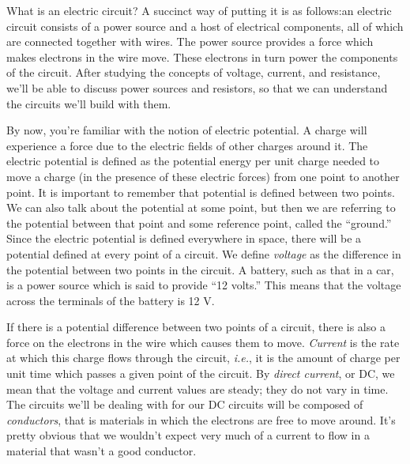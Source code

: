 What is an electric circuit?  A succinct way of putting it is as follows:an 
electric circuit consists of a power source and a host of electrical 
components, all of which are connected together with wires.  The power source 
provides a force which makes electrons in the wire move.  These electrons in 
turn power the components of the circuit. After studying the concepts of 
voltage, current, and resistance, we'll be able to discuss power sources and 
resistors, so that we can understand the circuits we'll build with them. 

By now, you're familiar with the notion of electric potential.  A charge will
experience a force due to the electric fields of other charges around it.
The electric potential is defined as the potential energy per unit charge 
needed to move a charge (in the presence of these electric forces) from one 
point to another point.  It is important to remember that potential is defined
between two points. We can also talk about the potential at some point, but 
then we are referring to the potential between that point and some reference 
point, called the ``ground.''  Since the electric potential is defined 
everywhere in space, there will be a potential defined at every point of a 
circuit. We define {\it voltage} as the difference in the potential between 
two points in the circuit.  A battery, such as that in a car, is a power 
source which is said to provide ``12 volts.'' This means that the voltage
across the terminals of the battery is 12 V. 

If there is a potential difference between two points of a circuit, there is 
also a force on the electrons in the wire which causes them to move.  
{\it Current} is the rate at which this charge flows through the circuit,
{\it i.e.}, it is the amount of charge per unit time which passes a given 
point of the circuit. By {\it direct current}, or DC, we mean that the voltage 
and current values are steady; they do not vary in time. The circuits we'll be 
dealing with for our DC circuits will be composed of {\it conductors}, that is 
materials in which the electrons are free to move around.  It's pretty obvious 
that we wouldn't expect very much of a current to flow in a material that 
wasn't a good conductor. 

